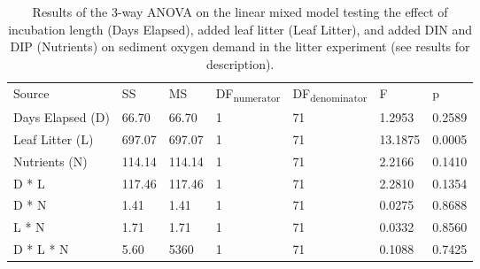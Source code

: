 \begin{table}
\label{tab:SOD_ANOVA}
\begin{tabular}{ l l l l l l l }

Source           & SS      & MS     & DF\textsubscript{numerator} & DF\textsubscript{denominator} & F       & p  \\
Days Elapsed (D) & 66.70   & 66.70  & 1                           & 71                            & 1.2953  & 0.2589 \\
Leaf Litter (L)  & 697.07  & 697.07 & 1                           & 71                            & 13.1875 & 0.0005 \\
Nutrients (N)    & 114.14  & 114.14 & 1                           & 71                            & 2.2166  & 0.1410 \\
D * L            & 117.46  & 117.46 & 1                           & 71                            & 2.2810  & 0.1354 \\
D * N            & 1.41    & 1.41   & 1                           & 71                            & 0.0275  & 0.8688 \\
L * N            & 1.71    & 1.71   & 1                           & 71                            & 0.0332  & 0.8560 \\
D * L * N        & 5.60    & 5360   & 1                           & 71                            & 0.1088  & 0.7425 \\

\end{tabular}
\caption{Results of the 3-way ANOVA on the linear mixed model testing the effect of incubation length (Days Elapsed), added leaf litter (Leaf Litter), and added DIN and DIP (Nutrients) on sediment oxygen demand in the litter experiment (see results for description).}
\end{table}